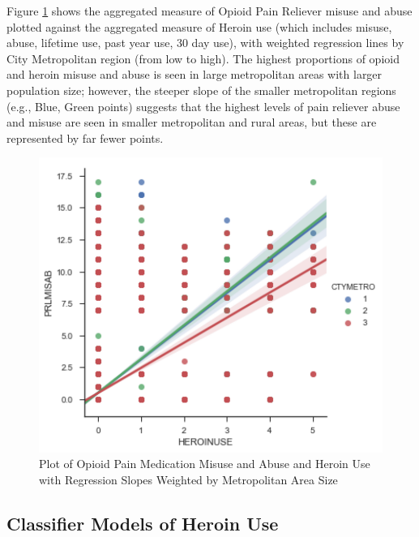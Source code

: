 \documentclass[sigconf]{acmart}
\begin{document}
Figure \ref{f:Figure2} shows the aggregated measure of Opioid Pain Reliever 
misuse and abuse plotted against the aggregated measure of Heroin use (which
includes misuse, abuse, lifetime use, past year use, 30 day use), with
weighted regression lines by City Metropolitan region (from low to high). 
The highest proportions of opioid and heroin misuse and abuse is seen in 
large metropolitan areas with larger population size; however, the steeper
slope of the smaller metropolitan regions (e.g., Blue, Green points)
suggests that the highest levels of pain reliever abuse and misuse are
seen in smaller metropolitan and rural areas, but these are represented
by far fewer points. 

\begin{figure}[!ht]
  \centering\includegraphics[width=\columnwidth]{images/Figure2.pdf}
  \caption{Plot of Opioid Pain Medication Misuse and Abuse and Heroin Use
  with Regression Slopes Weighted by Metropolitan Area Size}
  \label{f:Figure2}
\end{figure}


\subsection{Classifier Models of Heroin Use}
\end{document}
